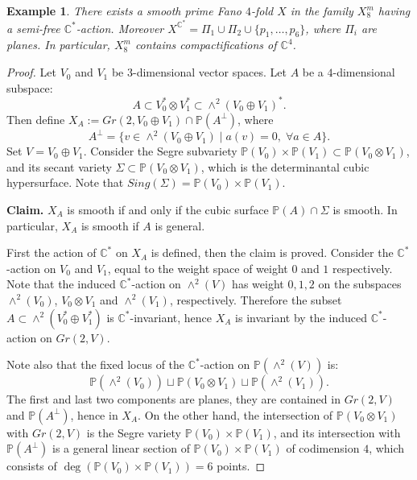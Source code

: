 \documentclass[12pt]{article}
\newtheorem{example}[theorem]{Example}
\begin{document}
\begin{example} \label{kuznetsov}
There exists a smooth prime Fano $4$-fold $X$ in the family $X^{m}_{8}$ having a semi-free $\mathbb{C}^*$-action. Moreover $X^{\mathbb{C}^*} = \Pi_1 \cup \Pi_2 \cup \{p_1,\ldots,p_6\}$, where $\Pi_i$ are planes. In particular,  $X^{m}_{8}$ contains compactifications of $\mathbb{C}^4$.
\end{example}
\begin{proof}
Let $V_0$ and $V_1$ be $3$-dimensional vector spaces. Let $A$ be a $4$-dimensional subspace: $$A \subset V_0^* \otimes V_1^* \subset \wedge^2 (V_0 \oplus V_1)^*.$$  Then define $X_A := Gr(2,V_0 \oplus V_1) \cap \mathbb{P}(A^{\perp})$, where $$A^{\perp} = \{v \in \wedge^2 (V_0 \oplus V_1) \mid a(v) =0, \; \forall a \in A\}.$$ Set $V = V_0 \oplus V_1$. Consider the Segre subvariety $\mathbb{P}(V_0) \times \mathbb{P}(V_1)  \subset \mathbb{P}(V_0 \otimes V_1)$, and its secant variety $\Sigma  \subset \mathbb{P}(V_0 \otimes V_1)$, which is the determinantal cubic hypersurface. Note that $Sing(\Sigma) = \mathbb{P}(V_0) \times \mathbb{P}(V_1) $.

\textbf{Claim.} $X_{A}$ is smooth if and only if the cubic surface $\mathbb{P}(A) \cap \Sigma$ is smooth. In particular, $X_{A}$ is smooth if $A$ is general.

First the action of $\mathbb{C}^*$ on $X_A$ is defined, then the claim is proved. Consider the $\mathbb{C}^*$-action on $V_0$ and $V_1$, equal to the weight space of weight $0$ and $1$ respectively. Note that the induced $\mathbb{C}^*$-action on $\wedge^{2}(V)$ has weight $0,1,2$ on the subspaces $\wedge^2(V_0)$, $V_0 \otimes V_1$ and $\wedge^2(V_1)$, respectively. Therefore the subset $A \subset \wedge^2 (V_0^* \oplus V_1^*)$ is $\mathbb{C}^*$-invariant, hence $X_A$ is invariant by the induced $\mathbb{C}^*$-action on $Gr(2,V)$.

Note also that the fixed locus of the $\mathbb{C}^*$-action on $\mathbb{P}(\wedge^2(V))$ is:
$$ \mathbb{P}(\wedge^2(V_0)) \sqcup \mathbb{P}(V_0 \otimes V_1) \sqcup \mathbb{P}( \wedge^2(V_1)). $$
The first and last two components are planes, they are contained in $Gr(2,V)$ and $\mathbb{P}(A^\perp)$, hence in $X_A$.  On the other hand, the intersection of $\mathbb{P}(V_0 \otimes V_1)$
with $Gr(2,V)$ is the Segre variety $\mathbb{P}(V_0) \times \mathbb{P}(V_1)$,
and its intersection with $\mathbb{P}(A^\perp)$ is a general linear
section of $\mathbb{P} (V_0) \times \mathbb{P}(V_1)$ of codimension $4$, which
consists of $\deg(\mathbb{P}(V_0) \times \mathbb{P}(V_1))  = 6$ points.  



\end{proof}
\end{document}
